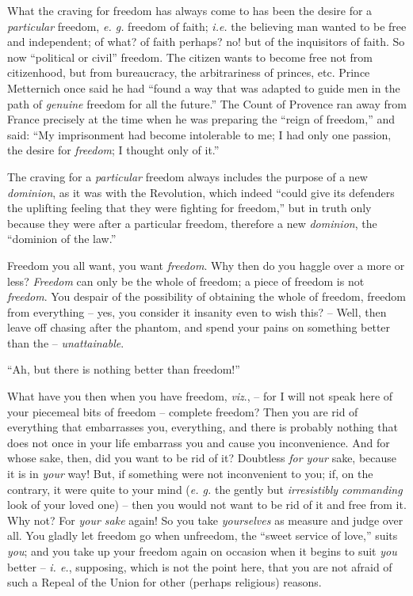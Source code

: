 \documentclass[12pt,a4paper]{book}
\begin{document}
What the craving for freedom has always come to has been the desire for a 
\textit{particular} freedom, \textit{e. g.} freedom of faith; \textit{i.e.} 
the believing man wanted to be free and independent; of what? of faith 
perhaps? no! but of the inquisitors of faith. So now ``political or civil'' 
freedom. The citizen wants to become free not from citizenhood, but from 
bureaucracy, the arbitrariness of princes, etc. Prince Metternich once said he 
had ``found a way that was adapted to guide men in the path of 
\textit{genuine} freedom for all the future.'' The Count of Provence ran away 
from France precisely at the time when he was preparing the ``reign of 
freedom,'' and said: ``My imprisonment had become intolerable to me; I had 
only one passion, the desire for \textit{freedom}; I thought only of it.''

The craving for a \textit{particular} freedom always includes the purpose of a 
new \textit{dominion}, as it was with the Revolution, which indeed ``could 
give its defenders the uplifting feeling that they were fighting for 
freedom,'' but in truth only because they were after a particular freedom, 
therefore a new \textit{dominion}, the ``dominion of the law.''

Freedom you all want, you want \textit{freedom}. Why then do you haggle over a 
more or less? \textit{Freedom} can only be the whole of freedom; a piece of 
freedom is not \textit{freedom}. You despair of the possibility of obtaining 
the whole of freedom, freedom from everything -- yes, you consider it insanity 
even to wish this? -- Well, then leave off chasing after the phantom, and 
spend your pains on something better than the -- \textit{unattainable}.

``Ah, but there is nothing better than freedom!''

What have you then when you have freedom, \textit{viz}., -- for I will not 
speak here of your piecemeal bits of freedom -- complete freedom? Then you are 
rid of everything that embarrasses you, everything, and there is probably 
nothing that does not once in your life embarrass you and cause you 
inconvenience. And for whose sake, then, did you want to be rid of it? 
Doubtless \textit{for your} sake, because it is in \textit{your} way! But, if 
something were not inconvenient to you; if, on the contrary, it were quite to 
your mind (\textit{e. g.} the gently but \textit{irresistibly commanding} look 
of your loved one) -- then you would not want to be rid of it and free from 
it. Why not? For \textit{your sake} again! So you take \textit{yourselves} as 
measure and judge over all. You gladly let freedom go when unfreedom, the 
``sweet service of love,'' suits \textit{you}; and you take up your freedom 
again on occasion when it begins to suit \textit{you} better -- \textit{i. 
e.}, supposing, which is not the point here, that you are not afraid of such a 
Repeal of the Union for other (perhaps religious) reasons.
\end{document}
